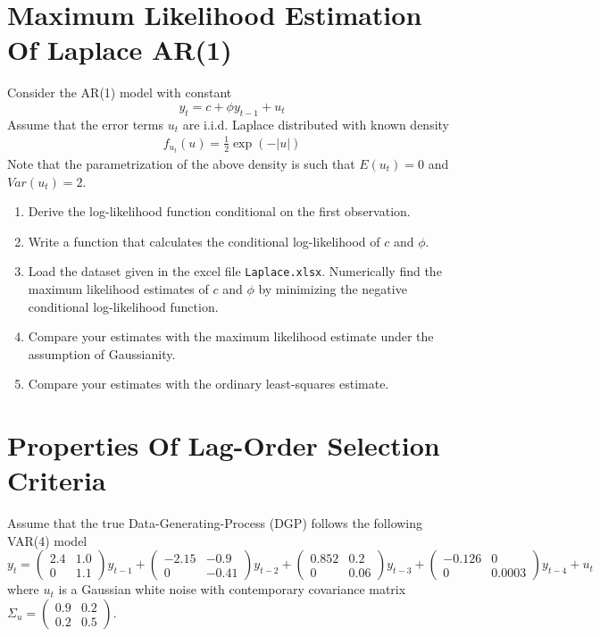 \documentclass{article}
\begin{document}
\newpage

\section[Maximum Likelihood Estimation Of Laplace AR{(1)}]{Maximum Likelihood Estimation Of Laplace AR{(1)}\label{ex:MaximumLikelihoodEstimationLaPlaceARp}}
Consider the AR{(1)} model with constant
$$ y_t = c + \phi y_{t-1} + u_t$$
Assume that the error terms $u_t$ are i.i.d. Laplace distributed with known density
\begin{align*}
f_{u_{t}}(u)=\frac{1}{2}\exp \left( -|u|\right)
\end{align*}
Note that the parametrization of the above density is such that $E(u_t)=0$ and $Var(u_t)=2$.
\begin{enumerate}
	\item Derive the log-likelihood function conditional on the first observation.
 	\item Write a function that calculates the conditional log-likelihood of $c$ and $\phi$.
 	\item Load the dataset given in the excel file \texttt{Laplace.xlsx}. Numerically find the maximum likelihood estimates of $c$ and $\phi$ by minimizing the negative conditional log-likelihood function.
 	\item Compare your estimates with the maximum likelihood estimate under the assumption of Gaussianity.
 	\item Compare your estimates with the ordinary least-squares estimate.
\end{enumerate}

\newpage

\section{Properties Of Lag-Order Selection Criteria}
Assume that the true Data-Generating-Process (DGP) follows the following VAR{(4)} model
$$y_t = \begin{pmatrix}
2.4 & 1.0\\
0 & 1.1
\end{pmatrix}
y_{t-1}+
\begin{pmatrix}
-2.15 & -0.9\\
0 & -0.41
\end{pmatrix}
y_{t-2}+
\begin{pmatrix}
0.852 & 0.2\\
0& 0.06
\end{pmatrix}
y_{t-3}+
\begin{pmatrix}
-0.126 & 0\\
0 & 0.0003
\end{pmatrix}
y_{t-4}
+ u_t$$
where $u_t$ is a Gaussian white noise with contemporary covariance matrix $\Sigma_u = \begin{pmatrix}
0.9&0.2\\0.2&0.5
\end{pmatrix}$.
\end{document}
